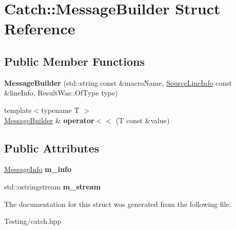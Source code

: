 \hypertarget{struct_catch_1_1_message_builder}{\section{Catch\-:\-:Message\-Builder Struct Reference}
\label{struct_catch_1_1_message_builder}
}
\subsection*{Public Member Functions}
\begin{DoxyCompactItemize}
\item 
\hypertarget{struct_catch_1_1_message_builder_ab0c6378e722680bf58852c6ee2b6e724}{{\bfseries Message\-Builder} (std\-::string const \&macro\-Name, \hyperlink{struct_catch_1_1_source_line_info}{Source\-Line\-Info} const \&line\-Info, Result\-Was\-::\-Of\-Type type)}\label{struct_catch_1_1_message_builder_ab0c6378e722680bf58852c6ee2b6e724}

\item 
\hypertarget{struct_catch_1_1_message_builder_a20fa48d069b20dddcc2d3df8abb123c1}{{\footnotesize template$<$typename T $>$ }\\\hyperlink{struct_catch_1_1_message_builder}{Message\-Builder} \& {\bfseries operator$<$$<$} (T const \&value)}\label{struct_catch_1_1_message_builder_a20fa48d069b20dddcc2d3df8abb123c1}

\end{DoxyCompactItemize}
\subsection*{Public Attributes}
\begin{DoxyCompactItemize}
\item 
\hypertarget{struct_catch_1_1_message_builder_a979f1c2b36d78f80ee275bfa5ba0209f}{\hyperlink{struct_catch_1_1_message_info}{Message\-Info} {\bfseries m\-\_\-info}}\label{struct_catch_1_1_message_builder_a979f1c2b36d78f80ee275bfa5ba0209f}

\item 
\hypertarget{struct_catch_1_1_message_builder_a6488ab0cc4ea52affc9c0612c7c5df6b}{std\-::ostringstream {\bfseries m\-\_\-stream}}\label{struct_catch_1_1_message_builder_a6488ab0cc4ea52affc9c0612c7c5df6b}

\end{DoxyCompactItemize}


The documentation for this struct was generated from the following file\-:\begin{DoxyCompactItemize}
\item 
Testing/catch.\-hpp\end{DoxyCompactItemize}
